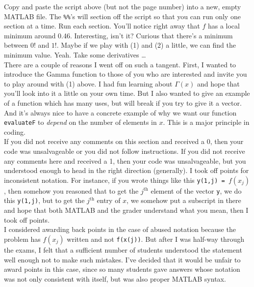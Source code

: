 \documentclass{article}
\begin{document}
Copy and paste the script above (but not the page number) into a new, empty MATLAB file. The \texttt{\%\%}'s will section off the script so that you can run only one section at a time. Run each section. You'll notice right away that $f$ has a local minimum around 0.46. Interesting, isn't it? Curious that there's a minimum between $0!$ and $1!$. Maybe if we play with (1) and (2) a little, we can find the minimum value. Yeah. Take some derivatives \dots \\

There are a couple of reasons I went off on such a tangent. First, I wanted to introduce the Gamma function to those of you who are interested and invite you to play around with (1) above. I had fun learning about $\Gamma (x)$ and hope that you'll look into it a little on your own time. But I also wanted to give an example of a function which has many uses, but will break if you try to give it a vector. And it's always nice to have a concrete example of why we want our function \texttt{evaluateF} to \emph{depend} on the number of elements in $x$. This is a major principle in coding.\\

If you did not receive any comments on this section and received a 0, then your code was unsalvageable or you did not follow instructions. If you did not receive any comments here and received a 1, then your code was unsalvageable, but you understood enough to head in the right direction (generally). I took off points for inconsistent notation. For instance, if you wrote things like this \texttt{y(1,j) = }$f(x_j)$, then somehow you reasoned that to get the $j^\text{th}$ element of the vector \texttt{y}, we do this \texttt{y(1,j)}, but to get the $j^\text{th}$ entry of $x$, we somehow put a subscript in there and hope that both MATLAB and the grader understand what you mean, then I took off points. \\

I considered awarding back points in the case of abused notation because the problem has $f(x_j)$ written and not \texttt{f(x(j))}. But after I was half-way through the exams, I felt that a sufficient number of students understood the statement well enough not to make such mistakes. I've decided that it would be unfair to award points in this case, since so many students gave answers whose notation was not only consistent with itself, but was also proper MATLAB syntax.
\end{document}
